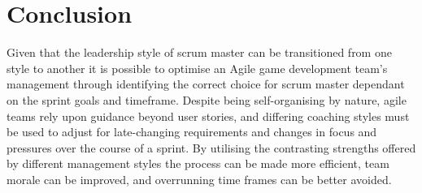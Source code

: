 \documentclass{scrartcl}
\begin{document}
\section*{Conclusion}

Given that the leadership style of scrum master can be transitioned from one style to another it is possible to optimise an Agile game development team's management through identifying the correct choice for scrum master dependant on the sprint goals and timeframe.  Despite being self-organising by nature, agile teams rely upon guidance beyond user stories, and differing coaching styles must be used to adjust for late-changing requirements and changes in focus and pressures over the course of a sprint.  By utilising the contrasting strengths offered by different management styles the process can be made more efficient, team morale can be improved, and overrunning time frames can be better avoided. 



\end{document}
